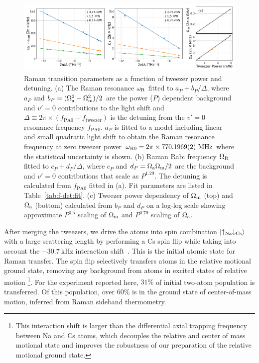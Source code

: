 \documentclass[aps,prx,twocolumn,10pt,superscriptaddress]{revtex4-2}
\newcommand{\paren}[1]{{\left({#1}\right)}}
\newcommand{\Na}{\mathrm{Na}}
\newcommand{\Cs}{\mathrm{Cs}}
\newcommand{\todo}[1]{}
\begin{document}
\begin{figure}[htb]
  \includegraphics[width=\textwidth]{fig-det.pdf}
  \caption{Raman transition parameters as a function of tweezer power and detuning.
    (a) The Raman resonance $\omega_{\rm R}$ fitted to $a_P+b_P/\Delta$, where
    $a_P$ and $b_P=(\Omega_{\rm a}^2-\Omega_{\rm m}^2)/2$
    are the power ($P$) dependent background and $v'=0$ contributions
    to the light shift and
    $\Delta\equiv2\pi\times\paren{f_{\mathrm{PA}0} - f_{\mathrm{tweezer}}}$ is the detuning from
    the $v'=0$ resonance frequency $f_{\mathrm{PA}0}$.
    $a_P$ is fitted to a model including linear and small quadratic light shift
    \todo{which assumes $\Omega_{\rm m}\gg\Omega_{\rm a}$} to obtain the Raman resonance frequency
    at zero tweezer power $\omega_{\rm R0}=2\pi\times770.1969(2)~\mathrm{MHz}$ where the statistical uncertainty is shown.
    (b) Raman Rabi frequency $\Omega_{\rm R}$ fitted to $c_P+d_P/\Delta$, where
    $c_P$ and $d_P=\Omega_{\rm a}\Omega_{\rm m}/2$
    are the background and $v'=0$ contributions that scale as $P^{1.29}$.
    The detuning is calculated from $f_{\mathrm{PA}0}$ fitted in (a). Fit parameters are listed in Table~\ref{tab:f-det:fit}.
    (c) Tweezer power dependency of $\Omega_{\rm m}$ (top) and $\Omega_{\rm a}$ (bottom) calculated from
    $b_P$ and $d_P$ on a log-log scale showing approximate $P^{0.5}$ scaling of $\Omega_{\rm m}$ and
    $P^{0.79}$ scaling of $\Omega_{\rm a}$.
    \label{f-det}}
\end{figure}

After merging the tweezers, we drive the atoms into spin combination $\ket{\uparrow_{\Na} \downarrow_{\Cs}}$ with a large scattering length
by performing a Cs spin flip while taking into account
the $-30.7~\mathrm{kHz}$ interaction shift~\cite{Hood2019}.
This is the initial atomic state for Raman transfer.
The spin flip selectively transfers atoms in the relative motional ground state,
removing any background from atoms in excited states of relative motion
\footnote{This interaction shift is larger than the differential axial trapping frequency
  between Na and Cs atoms, which decouples the relative and center of mass motional state
  and improves the robustness of our preparation of the relative motional ground state.}.
For the experiment reported here,
$31\mathrm{\%}$ of initial two-atom population is transferred. Of this population, over $60\%$ is in the ground state of center-of-mass motion, inferred from Raman sideband thermometry.
\end{document}
